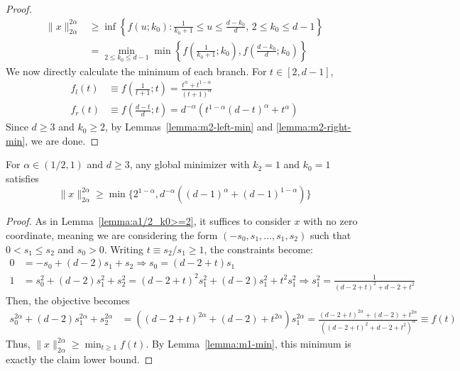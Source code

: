 \documentclass[11pt]{article}
\begin{document}
\begin{proof}
\begin{align*}
    \|x\|_{2\alpha}^{2\alpha}&\geq \inf \left\{f(u;k_0):\frac{1}{k_0+1}\leq u\leq \frac{d-k_0}{d},\,2\leq k_0\leq d-1\right\}\\&=\min_{2\leq k_0\leq d-1}\min \left \{f\left(\frac{1}{k_0+1};k_0\right),f\left(\frac{d-k_0}{d};k_0\right)\right\}
    \end{align*}
    We now directly calculate the minimum of each branch. For $t\in [2,d-1]$, 
    \begin{align*}
        f_l(t)&\equiv f\left(\frac{1}{t+1};t\right)=\frac{t^{\alpha}+t^{1-\alpha}}{(t+1)^{\alpha}}\\
        f_r(t)&\equiv f\left(\frac{d-t}{d};t\right)=d^{-\alpha}(t^{1-\alpha}(d-t)^\alpha+t^\alpha)
    \end{align*}
    Since $d\geq 3$ and $k_0\geq 2$, by Lemmas~\ref{lemma:m2-left-min} and \ref{lemma:m2-right-min}, we are done.
\end{proof}

\begin{lemma}\label{lemma:alpha1/2_k0=1}
    For $\alpha \in (1/2,1)$ and $d\geq 3$, any global minimizer with $k_2=1$ and $k_0=1$ satisfies
    $$\|x\|_{2\alpha}^{2\alpha}\geq \min\{2^{1-\alpha},d^{-\alpha}((d-1)^{\alpha}+(d-1)^{1-\alpha})\}$$
\end{lemma}
\begin{proof}
    As in Lemma~\ref{lemma:a1/2_k0>=2}, it suffices to consider $x$ with no zero coordinate, meaning we are considering the form $(-s_0,s_1,\dots,s_1,s_2)$ such that $0< s_1\leq s_2$ and $s_0 > 0$. Writing $t\equiv s_2/s_1\geq 1$, the constraints become:
    \begin{align*}
       0&=-s_0+(d-2)s_1+s_2\Rightarrow s_0=(d-2+t)s_1\\
       1&=s_0^2 +(d-2)s_1^2+s_2^2=(d-2+t)^2s_1^2+(d-2)s_1^2+t^2s_1^2\Rightarrow s_1^2=\frac{1}{(d-2+t)^2 +d-2+t^2 }
    \end{align*}
    Then, the objective becomes
    \begin{align*}
        s_0^{2\alpha}+(d-2)s_1^{2\alpha}+s_2^{2\alpha}&=((d-2+t)^{2\alpha}+(d-2)+t^{2\alpha})s_1^{2\alpha}=\frac{(d-2+t)^{2\alpha}+(d-2)+t^{2\alpha}}{((d-2+t)^{2} +d-2+t^2 )^\alpha}\equiv f(t)
    \end{align*}
    Thus, $\|x\|_{2\alpha}^{2\alpha}\geq \min_{t\geq 1}f(t)$. By Lemma~\ref{lemma:m1-min}, this minimum is exactly the claim lower bound. 
\end{proof}
\end{document}

